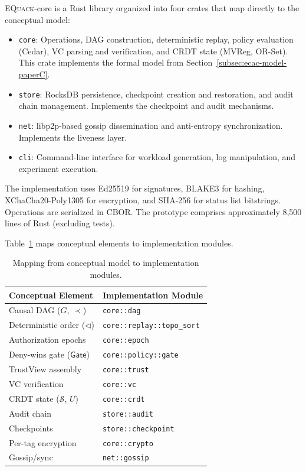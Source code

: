 \documentclass[10pt,journal,compsoc]{IEEEtran}
\newcommand{\equack}{\textsc{EQuack}}
\begin{document}
\equack{}-core is a Rust library organized into four crates that map directly to the conceptual model:

\begin{itemize}
    \item \texttt{core}: Operations, DAG construction, deterministic replay, policy evaluation (Cedar), VC parsing and verification, and CRDT state (MVReg, OR-Set). This crate implements the formal model from Section~\ref{subsec:ecac-model-paperC}.
    \item \texttt{store}: RocksDB persistence, checkpoint creation and restoration, and audit chain management. Implements the checkpoint and audit mechanisms.
    \item \texttt{net}: libp2p-based gossip dissemination and anti-entropy synchronization. Implements the liveness layer.
    \item \texttt{cli}: Command-line interface for workload generation, log manipulation, and experiment execution.
\end{itemize}

The implementation uses Ed25519 for signatures, BLAKE3 for hashing, XChaCha20-Poly1305 for encryption, and SHA-256 for status list bitstrings. Operations are serialized in CBOR. The prototype comprises approximately 8,500 lines of Rust (excluding tests).

Table~\ref{tab:impl-mapping-paperC} maps conceptual elements to implementation modules.

\begin{table}[htbp]
\centering
\caption{Mapping from conceptual model to implementation modules.}
\label{tab:impl-mapping-paperC}
\begin{tabular}{@{}ll@{}}
\toprule
\textbf{Conceptual Element} & \textbf{Implementation Module} \\
\midrule
Causal DAG ($G$, $\prec$) & \texttt{core::dag} \\
Deterministic order ($\triangleleft$) & \texttt{core::replay::topo\_sort} \\
Authorization epochs & \texttt{core::epoch} \\
Deny-wins gate ($\mathsf{Gate}$) & \texttt{core::policy::gate} \\
TrustView assembly & \texttt{core::trust} \\
VC verification & \texttt{core::vc} \\
CRDT state ($\mathcal{S}$, $U$) & \texttt{core::crdt} \\
Audit chain & \texttt{store::audit} \\
Checkpoints & \texttt{store::checkpoint} \\
Per-tag encryption & \texttt{core::crypto} \\
Gossip/sync & \texttt{net::gossip} \\
\bottomrule
\end{tabular}
\end{table}
\end{document}
